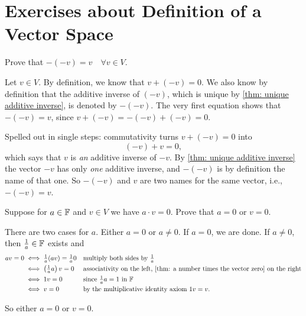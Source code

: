 \section*{Exercises about Definition of a Vector Space}

\begin{xrcs}
  Prove that $-(-v) = v \quad \forall v \in V$.

  \begin{xprf}
    Let $v \in V$. By definition, we know that $v + (-v) = 0$. We also know by definition that the additive inverse of $(-v)$, which is unique by \ref{thm: unique additive inverse}, is denoted by $-(-v)$. The very first equation shows that $-(-v) = v$, since $v + (-v) = -(-v) + (-v) = 0$.

    Spelled out in single steps: commutativity turns $v + (-v) = 0$ into
    \begin{equation}
      (-v) + v = 0,
    \end{equation}
    which says that $v$ is \emph{an} additive inverse of $-v$. By \ref{thm: unique additive inverse} the vector $-v$ has only \emph{one} additive inverse, and $-(-v)$ is by definition the name of that one. So $-(-v)$ and $v$ are two names for the same vector, i.e., $-(-v) = v$.
  \end{xprf}
\end{xrcs}

\begin{xrcs}
  Suppose for $a \in \mathbb{F}$ and $v \in V$ we have $a \cdot v = 0$. Prove that $a=0$ or $v=0$.

  \begin{xprf}
    There are two cases for $a$. Either $a=0$ or $a\neq 0$. If $a=0$, we are done. If $a \neq 0$, then $\tfrac{1}{a} \in \mathbb{F}$ exists and
    \[
      \begin{aligned}
        av=0
        &\iff \tfrac{1}{a}(av)=\tfrac{1}{a}0
        &&\text{multiply both sides by } \tfrac{1}{a} \\
        &\iff \left(\tfrac{1}{a} a \right)v = 0
        &&\text{associativity on the left, \ref{thm: a number times the vector zero} on the right} \\
        &\iff 1v = 0
        &&\text{since } \tfrac{1}{a} a = 1 \text{ in } \mathbb{F} \\
        &\iff v = 0
        &&\text{by the multiplicative identity axiom } 1v = v.
      \end{aligned}
    \]

    So either $a=0$ or $v=0$.
  \end{xprf}
\end{xrcs}

